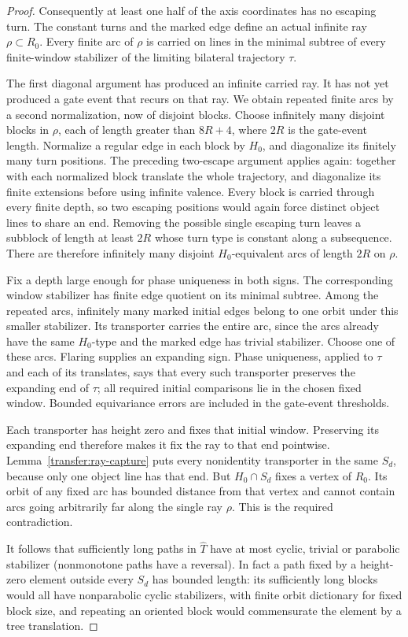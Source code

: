 \begin{proof}
Consequently at least one half of the axis coordinates has no escaping turn. The constant turns and the marked edge define an actual infinite ray \(\rho\subset R_0\). Every finite arc of \(\rho\) is carried on lines in the minimal subtree of every finite-window stabilizer of the limiting bilateral trajectory \(\tau\).

The first diagonal argument has produced an infinite carried ray. It has not yet produced a gate event that recurs on that ray. We obtain repeated finite arcs by a second normalization, now of disjoint blocks. Choose infinitely many disjoint blocks in \(\rho\), each of length greater than \(8R+4\), where \(2R\) is the gate-event length. Normalize a regular edge in each block by \(H_0\), and diagonalize its finitely many turn positions. The preceding two-escape argument applies again: together with each normalized block translate the whole trajectory, and diagonalize its finite extensions before using infinite valence. Every block is carried through every finite depth, so two escaping positions would again force distinct object lines to share an end. Removing the possible single escaping turn leaves a subblock of length at least \(2R\) whose turn type is constant along a subsequence. There are therefore infinitely many disjoint \(H_0\)-equivalent arcs of length \(2R\) on \(\rho\).

Fix a depth large enough for phase uniqueness in both signs. The corresponding window stabilizer has finite edge quotient on its minimal subtree. Among the repeated arcs, infinitely many marked initial edges belong to one orbit under this smaller stabilizer. Its transporter carries the entire arc, since the arcs already have the same \(H_0\)-type and the marked edge has trivial stabilizer. Choose one of these arcs. Flaring supplies an expanding sign. Phase uniqueness, applied to \(\tau\) and each of its translates, says that every such transporter preserves the expanding end of \(\tau\); all required initial comparisons lie in the chosen fixed window. Bounded equivariance errors are included in the gate-event thresholds.

Each transporter has height zero and fixes that initial window. Preserving its expanding end therefore makes it fix the ray to that end pointwise. Lemma~\ref{transfer:ray-capture} puts every nonidentity transporter in the same \(S_d\), because only one object line has that end. But \(H_0\cap S_d\) fixes a vertex of \(R_0\). Its orbit of any fixed arc has bounded distance from that vertex and cannot contain arcs going arbitrarily far along the single ray \(\rho\). This is the required contradiction.

It follows that sufficiently long paths in \(\widehat T\) have at most cyclic, trivial or parabolic stabilizer (nonmonotone paths have a reversal). In fact a path fixed by a height-zero element outside every \(S_d\) has bounded length: its sufficiently long blocks would all have nonparabolic cyclic stabilizers, with finite orbit dictionary for fixed block size, and repeating an oriented block would commensurate the element by a tree translation.

\end{proof}

